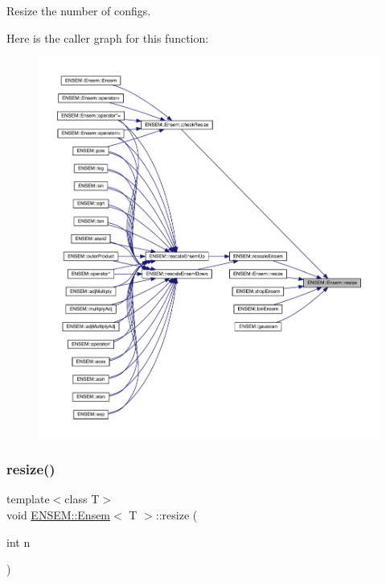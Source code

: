 Resize the number of configs. 

Here is the caller graph for this function\+:
\nopagebreak
\begin{figure}[H]
\begin{center}
\leavevmode
\includegraphics[width=350pt]{d7/d3e/classENSEM_1_1Ensem_ae43aa68aaca92143baffe83310657f4a_icgraph}
\end{center}
\end{figure}
\mbox{\label{classENSEM_1_1Ensem_ae43aa68aaca92143baffe83310657f4a}} 
\subsubsection{\texorpdfstring{resize()}{resize()}\hspace{0.1cm}{\footnotesize\ttfamily [2/6]}}
{\footnotesize\ttfamily template$<$class T$>$ \\
void \mbox{\hyperlink{classENSEM_1_1Ensem}{E\+N\+S\+E\+M\+::\+Ensem}}$<$ T $>$\+::resize (\begin{DoxyParamCaption}\item[{int}]{n }\end{DoxyParamCaption})\hspace{0.3cm}{\ttfamily [inline]}}



